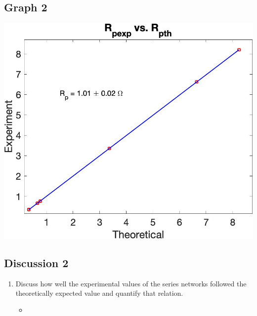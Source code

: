 \documentclass{article}
\begin{document}
\begin{table}[!htp]
\begin{center}
    \subsection*{Graph 2}
    \includegraphics[scale=0.18]{RP_graph.jpeg}
    \subsection*{Discussion 2}
    \begin{enumerate}
      \item Discuss how well the experimental values of the series networks followed the theoretically expected value and quantify that relation.
      \begin{itemize}
        \item
      \end{itemize}
    \end{enumerate}
  \end{center}
\end{table}
\end{document}
